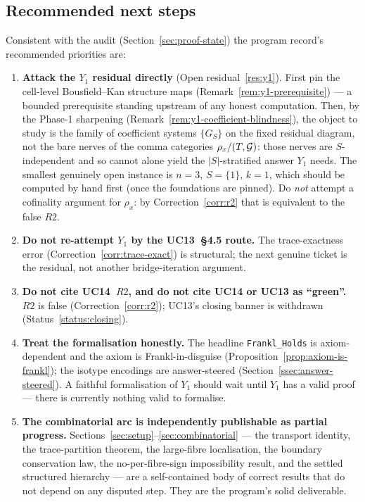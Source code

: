 \subsection{Recommended next steps}
\label{ssec:next-steps}

Consistent with the audit (Section~\ref{sec:proof-state}) the program
record's recommended priorities are:

\begin{enumerate}[leftmargin=1.8em]
\item \textbf{Attack the $Y_1$ residual directly}
  (Open residual~\ref{res:y1}). First pin the cell-level Bousfield--Kan
  structure maps (Remark~\ref{rem:y1-prerequisite}) --- a bounded
  prerequisite standing upstream of any honest computation. Then, by the
  Phase-1 sharpening (Remark~\ref{rem:y1-coefficient-blindness}), the
  object to study is the family of coefficient systems $\{G_S\}$ on the
  fixed residual diagram, not the bare nerves of the comma categories
  $\rho_x/(T,\mathcal{G})$: those nerves are $S$-independent and so cannot alone
  yield the $|S|$-stratified answer $Y_1$ needs. The smallest genuinely
  open instance is $n=3$, $S=\{1\}$, $k=1$, which should be computed by
  hand first (once the foundations are pinned). Do \emph{not} attempt a
  cofinality argument for $\rho_x$: by Correction~\ref{corr:r2} that is
  equivalent to the false $R2$.
\item \textbf{Do not re-attempt $Y_1$ by the UC13~\S4.5 route.} The
  trace-exactness error (Correction~\ref{corr:trace-exact}) is
  structural; the next genuine ticket is the residual, not another
  bridge-iteration argument.
\item \textbf{Do not cite UC14~$R2$, and do not cite UC14 or UC13 as
  ``green''.} $R2$ is false (Correction~\ref{corr:r2}); UC13's closing
  banner is withdrawn (Status~\ref{status:closing}).
\item \textbf{Treat the formalisation honestly.} The headline
  \texttt{Frankl\_Holds} is axiom-dependent and the axiom is
  Frankl-in-disguise (Proposition~\ref{prop:axiom-is-frankl}); the
  isotype encodings are answer-steered
  (Section~\ref{ssec:answer-steered}). A faithful formalisation of
  $Y_1$ should wait until $Y_1$ has a valid proof --- there is
  currently nothing valid to formalise.
\item \textbf{The combinatorial arc is independently publishable as
  partial progress.} Sections~\ref{sec:setup}--\ref{sec:combinatorial}
  --- the transport identity, the trace-partition theorem, the
  large-fibre localisation, the boundary conservation law, the
  no-per-fibre-sign impossibility result, and the settled structured
  hierarchy --- are a self-contained body of correct results that do
  not depend on any disputed step. They are the program's solid
  deliverable.
\end{enumerate}

